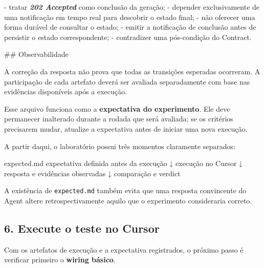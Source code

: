 \documentclass[
  10pt,
  a4paper,
  oneside]{book}
\newenvironment{Shaded}{}{}
\newcommand{\FunctionTok}[1]{\textcolor[rgb]{0.02,0.16,0.49}{#1}}
\newcommand{\InformationTok}[1]{\textcolor[rgb]{0.38,0.63,0.69}{\textbf{\textit{#1}}}}
\newcommand{\NormalTok}[1]{#1}
\newcommand{\SpecialStringTok}[1]{\textcolor[rgb]{0.73,0.40,0.53}{#1}}
\renewenvironment{Shaded}{\begin{snugshade}}{\end{snugshade}}%
\begin{document}
\begin{Shaded}
\begin{Highlighting}[]
\SpecialStringTok{{-} }\NormalTok{tratar }\InformationTok{\textasciigrave{}202 Accepted\textasciigrave{}}\NormalTok{ como conclusão da geração;}
\SpecialStringTok{{-} }\NormalTok{depender exclusivamente de uma notificação em tempo real para descobrir o estado final;}
\SpecialStringTok{{-} }\NormalTok{não oferecer uma forma durável de consultar o estado;}
\SpecialStringTok{{-} }\NormalTok{emitir a notificação de conclusão antes de persistir o estado correspondente;}
\SpecialStringTok{{-} }\NormalTok{contradizer uma pós{-}condição do Contract.}

\FunctionTok{\#\# Observabilidade}

\NormalTok{A correção da resposta não prova que todas as transições esperadas ocorreram. A participação de cada artefato deverá ser avaliada separadamente com base nas evidências disponíveis após a execução.}
\end{Highlighting}
\end{Shaded}

Esse arquivo funciona como a \textbf{expectativa do experimento}. Ele
deve permanecer inalterado durante a rodada que será avaliada; se os
critérios precisarem mudar, atualize a expectativa antes de iniciar uma
nova execução.

A partir daqui, o laboratório possui três momentos claramente separados:

\begin{Shaded}
\begin{Highlighting}[]
\NormalTok{expected.md}
\NormalTok{expectativa definida antes da execução}
\NormalTok{              ↓}
\NormalTok{         execução no Cursor}
\NormalTok{              ↓}
\NormalTok{resposta e evidências observadas}
\NormalTok{              ↓}
\NormalTok{       comparação e verdict}
\end{Highlighting}
\end{Shaded}

A existência de \texttt{expected.md} também evita que uma resposta
convincente do Agent altere retrospectivamente aquilo que o experimento
consideraria correto.

\hypertarget{execute-o-teste-no-cursor}{%
\subsection{6. Execute o teste no
Cursor}\label{execute-o-teste-no-cursor}}

Com os artefatos de execução e a expectativa registrados, o próximo
passo é verificar primeiro o \textbf{wiring básico}.
\end{document}
